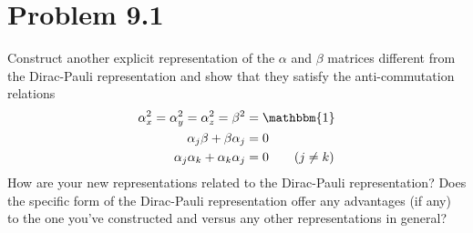 \documentclass[12pt,a4paper]{article}
\begin{document}
	\section*{
		Problem 9.1
	}
	\begin{problem}
		Construct another explicit representation of the $\alpha$ and $\beta$ matrices
		different from the Dirac-Pauli representation and show that they satisfy the anti-commutation
		relations 
		\begin{align}
			\alpha_x^2 =
			\alpha_y^2 =
			\alpha_z^2 =
			\beta^2 
			&= \mathbbm{1}\\
			\alpha_j \beta + \beta \alpha_j 
			&= 0\\
			\alpha_j \alpha_k 
			+
			\alpha_k \alpha_j 
			&= 0\qquad (j\neq k) 
		\end{align}
		How are your new representations related to the Dirac-Pauli
		representation? Does the specific form of the Dirac-Pauli representation
		offer any advantages (if any) to the one you've constructed and versus
		any other representations in general?
	\end{problem}
\end{document}

